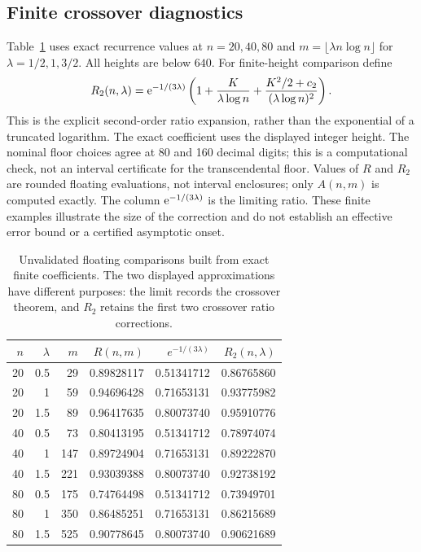 \documentclass[11pt,letterpaper]{article}
\theoremstyle{remark}\newtheorem{remark}[theorem]{Remark}
\begin{document}
\subsection{Finite crossover diagnostics}\label{ied:log:sub:finitediag}
Table~\ref{ied:log:tab:finite} uses exact recurrence values at
$n=20,40,80$ and $m=\lfloor\lambda n\log n\rfloor$ for
$\lambda=1/2,1,3/2$. All heights are below $640$. For finite-height comparison define
\begin{equation}\label{ied:log:eq:finiteapprox}
 R_2(n,\lambda)=\mathrm e^{-1/(3\lambda)}
 \left(1+\frac{K}{\lambda\log n}
 +\frac{K^2/2+c_2}{(\lambda\log n)^2}\right).
\end{equation}
This is the explicit second-order ratio expansion, rather than the exponential of a truncated logarithm. The exact coefficient uses the displayed integer height. The nominal floor choices agree at 80 and 160 decimal digits; this is a computational check, not an interval certificate for the transcendental floor. Values of $R$ and $R_2$ are rounded floating evaluations, not interval enclosures; only $A(n,m)$ is computed exactly. The column $\mathrm e^{-1/(3\lambda)}$ is the limiting ratio. These finite examples illustrate the size of the correction and do not establish an effective error bound or a certified asymptotic onset.
\begin{table}[htbp]
\centering\small
\begin{tabular}{rrrrrr}
\hline
$n$ & $\lambda$ & $m$ & $R(n,m)$ & $e^{-1/(3\lambda)}$ & $R_2(n,\lambda)$ \\
\hline
20 & 0.5 & 29 & 0.89828117 & 0.51341712 & 0.86765860 \\
20 & 1 & 59 & 0.94696428 & 0.71653131 & 0.93775982 \\
20 & 1.5 & 89 & 0.96417635 & 0.80073740 & 0.95910776 \\
40 & 0.5 & 73 & 0.80413195 & 0.51341712 & 0.78974074 \\
40 & 1 & 147 & 0.89724904 & 0.71653131 & 0.89222870 \\
40 & 1.5 & 221 & 0.93039388 & 0.80073740 & 0.92738192 \\
80 & 0.5 & 175 & 0.74764498 & 0.51341712 & 0.73949701 \\
80 & 1 & 350 & 0.86485251 & 0.71653131 & 0.86215689 \\
80 & 1.5 & 525 & 0.90778645 & 0.80073740 & 0.90621689 \\
\hline
\end{tabular}
\caption{Unvalidated floating comparisons built from exact finite coefficients. The two displayed approximations have different purposes: the limit records the crossover theorem, and $R_2$ retains the first two crossover ratio corrections.}\label{ied:log:tab:finite}
\end{table}
\end{document}
